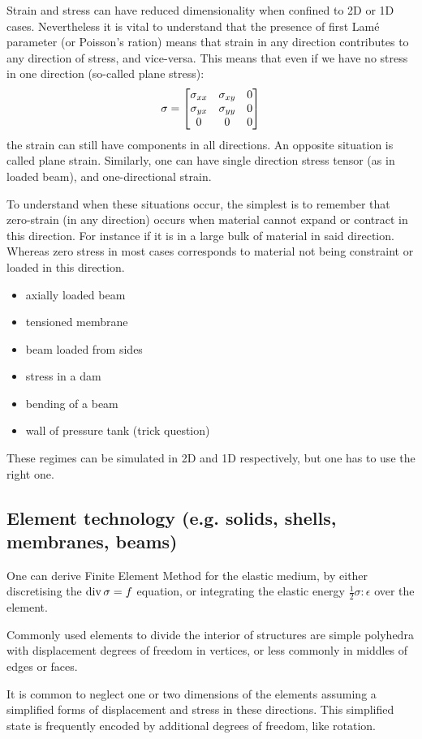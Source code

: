 \documentclass[12pt]{article}
\begin{document}
Strain and stress can have reduced dimensionality when confined to 2D or 1D cases. Nevertheless it is vital to understand that the presence of first Lam\'e parameter (or Poisson's ration) means that strain in any direction contributes to any direction of stress, and vice-versa. This means that even if we have no stress in one direction (so-called plane stress):
\[\sigma=\left[\begin{matrix}
\sigma_{xx}&\sigma_{xy}&0\\
\sigma_{yx}&\sigma_{yy}&0\\
0&0&0\end{matrix}\right]\]
the strain can still have components in all directions. An opposite situation is called plane strain. Similarly, one can have single direction stress tensor (as in loaded beam), and one-directional strain.

To understand when these situations occur, the simplest is to remember that zero-strain (in any direction) occurs when material cannot expand or contract in this direction. For instance if it is in a large bulk of material in said direction. Whereas zero stress in most cases corresponds to material not being constraint or loaded in this direction.
\begin{itemize}
    \item axially loaded beam
    \item tensioned membrane
    \item beam loaded from sides
    \item stress in a dam
    \item bending of a beam
    \item wall of pressure tank (trick question)
\end{itemize}

These regimes can be simulated in 2D and 1D respectively, but one has to use the right one.

\subsection{Element technology (e.g. solids, shells, membranes, beams)}

One can derive Finite Element Method for the elastic medium, by either discretising the $\operatorname{div}\sigma=f$ equation, or integrating the elastic energy $\frac{1}{2}\sigma:\epsilon$ over the element.

Commonly used elements to divide the interior of structures are simple polyhedra with displacement degrees of freedom in vertices, or less commonly in middles of edges or faces.

It is common to neglect one or two dimensions of the elements assuming a simplified forms of displacement and stress in these directions. This simplified state is frequently encoded by additional degrees of freedom, like rotation.
\end{document}
